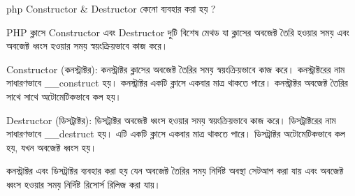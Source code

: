 php Constructor & Destructor কেনো ব্যবহার করা হয় ?

PHP ক্লাসে Constructor এবং Destructor দুটি বিশেষ মেথড যা ক্লাসের অবজেক্ট তৈরি হওয়ার সময় এবং অবজেক্ট ধ্বংস হওয়ার সময় স্বয়ংক্রিয়ভাবে কাজ করে।

Constructor (কনস্ট্রাক্টর):
কনস্ট্রাক্টর ক্লাসের অবজেক্ট তৈরির সময় স্বয়ংক্রিয়ভাবে কাজ করে।
কনস্ট্রাক্টরের নাম সাধারণভাবে __construct হয়।
কনস্ট্রাক্টর একটি ক্লাসে একবার মাত্র থাকতে পারে।
কনস্ট্রাক্টর অবজেক্ট তৈরির সাথে সাথে অটোমেটিকভাবে কল হয়।





Destructor (ডিসট্রাক্টর):
ডিসট্রাক্টর অবজেক্ট ধ্বংস হওয়ার সময় স্বয়ংক্রিয়ভাবে কাজ করে।
ডিসট্রাক্টরের নাম সাধারণভাবে __destruct হয়।
এটি একটি ক্লাসে একবার মাত্র থাকতে পারে।
ডিসট্রাক্টর অটোমেটিকভাবে কল হয়, যখন অবজেক্ট ধ্বংস হয়।





    কনস্ট্রাক্টর এবং ডিসট্রাক্টর ব্যবহার করা হয় যেন অবজেক্ট তৈরির সময় নির্দিষ্ট অবস্থা সেটআপ করা যায় এবং অবজেক্ট ধ্বংস হওয়ার সময় নির্দিষ্ট রিসোর্স রিলিজ করা যায়।






